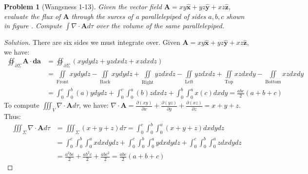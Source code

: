 \documentclass{article}
\theoremstyle{mystyle}
\newtheorem{problem}{Problem}[section]
\begin{document}
\begin{problem}[Wangsness 1-13]
\label{problem:EMAG_1_wangsness_1_13}
Given the vector field $\mathbf{A} = xy\hat{\mathbf{x}}+yz\hat{\mathbf{y}}+xz\hat{\mathbf{z}}$, evaluate the flux of $\mathbf{A}$ through the surces of a parallelepiped of sides $a,b,c$ shown in figure . Compute $\int \nabla \cdot \mathbf{A}d\tau$ over the volume of the same parallelepiped.
\end{problem}
\begin{proof}[Solution]
There are six sides we must integrate over. Given $\mathbf{A} = xy\hat{\mathbf{x}}+yz\hat{\mathbf{y}}+xz\hat{\mathbf{z}}$, we have:
\begin{align*}
    \oiint_{\partial \Sigma}\mathbf{A}\cdot \boldsymbol{da} &= \oiint_{\partial \Sigma} (xydydz + yzdxdz+xzdxdz)\\
    &=\underset{\textrm{Front}}{\iint}xydydz-\underset{\textrm{Back}}{\iint}xydydz+\underset{\textrm{Right}}{\iint}yzdxdz-\underset{\textrm{Left}}{\iint}yzdxdz+\underset{\textrm{Top}}{\iint}xzdxdy-\underset{\textrm{Bottom}}{\iint}xzdxdy\\
    &=\int_{0}^{c}\int_{0}^{b}(a)ydydz+\int_{0}^{c}\int_{0}^{a}(b)zdxdz+\int_{0}^{b}\int_{0}^{a}x(c)dxdy=\frac{abc}{2}(a+b+c)
\end{align*}
To compute $\iiint_{V}\nabla\cdot\mathbf{A}d\tau$, we have: $\nabla\cdot\mathbf{A}=\frac{\partial(xy)}{\partial x}+\frac{\partial(yz)}{\partial y}+\frac{\partial(xz)}{\partial z}=x+y+z$. Thus:
\begin{align*}
    \iiint_{\Sigma}\nabla\cdot\mathbf{A}d\tau &=\iiint_{\Sigma}(x+y+z)d\tau=\int_{0}^{c}\int_{0}^{b}\int_{0}^{a}(x+y+z)dxdydz\\
    &=\int_{0}^{c}\int_{0}^{b}\int_{0}^{a}xdxdydz+\int_{0}^{c}\int_{0}^{b}\int_{0}^{a}ydxdydz+\int_{0}^{c}\int_{0}^{b}\int_{0}^{a}zdxdydz\\
    &=\frac{a^{2}bc}{2}+\frac{ab^{2}c}{2}+\frac{abc^{2}}{2}=\frac{abc}{2}(a+b+c)
\end{align*}
\end{proof}
\end{document}
